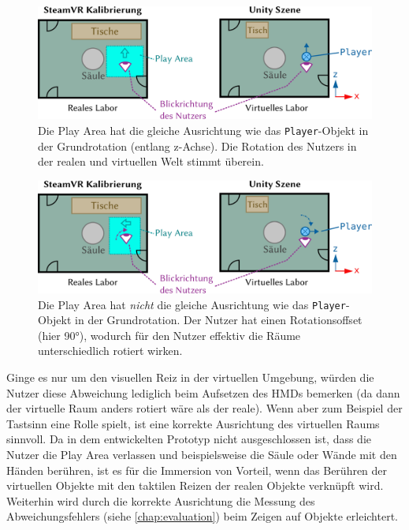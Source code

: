 \begin{figure}[hbt]
    \includegraphics[width=\textwidth]{figures/environment_setup_correct}
    \caption{Die Play Area hat die gleiche Ausrichtung wie das \lstinline{Player}-Objekt in der Grundrotation (entlang z-Achse). %
        Die Rotation des Nutzers in der realen und virtuellen Welt stimmt überein.}
    \label{fig:ve_setup_correct}
\end{figure}
\begin{figure}[hbt]
    \includegraphics[width=\textwidth]{figures/environment_setup_wrong}
    \caption{Die Play Area hat \emph{nicht} die gleiche Ausrichtung wie das \lstinline{Player}-Objekt in der Grundrotation. %
        Der Nutzer hat einen Rotationsoffset (hier \ang[detect-weight=true]{90}), wodurch für den Nutzer effektiv die Räume unterschiedlich rotiert wirken.}
    \label{fig:ve_setup_wrong}
\end{figure}

Ginge es nur um den visuellen Reiz in der virtuellen Umgebung, würden die Nutzer diese Abweichung lediglich beim Aufsetzen des HMDs bemerken (da dann der virtuelle Raum anders rotiert wäre als der reale).
Wenn aber zum Beispiel der Tastsinn eine Rolle spielt, ist eine korrekte Ausrichtung des virtuellen Raums sinnvoll.
Da in dem entwickelten Prototyp nicht ausgeschlossen ist, dass die Nutzer die Play Area verlassen und beispielsweise die Säule oder Wände mit den Händen berühren, ist es für die Immersion von Vorteil, wenn das Berühren der virtuellen Objekte mit den taktilen Reizen der realen Objekte verknüpft wird.
Weiterhin wird durch die korrekte Ausrichtung die Messung des Abweichungsfehlers (siehe \autoref{chap:evaluation}) beim Zeigen auf Objekte erleichtert.

